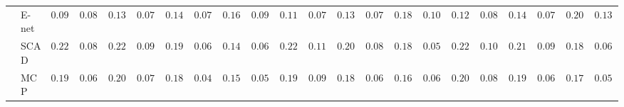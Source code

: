 \begin{tabular}{ll|ll|llllll|llllll|llllll}
 & E-net  & $0.0900$ & $0.0868$ & $0.1300$ & $0.0771$ & $0.1433$ & $0.0750$ & $0.1600$ & $0.0945$ & $0.1100$ & $0.0793$ & $0.1317$ & $0.0722$ & $0.1850$ & $0.1083$ & $0.1200$ & $0.0857$ & $0.1400$ & $0.0739$ & $0.2083$ & $0.1306$ \\
 & SCAD  & $0.2200$ & $0.0883$ & $0.2267$ & $0.0903$ & $0.1950$ & $0.0672$ & $0.1450$ & $0.0655$ & $0.2217$ & $0.1186$ & $0.2067$ & $0.0890$ & $0.1833$ & $0.0556$ & $0.2250$ & $0.1043$ & $0.2117$ & $0.0943$ & $0.1817$ & $0.0631$ \\
 & MCP  & $0.1967$ & $0.0686$ & $0.2017$ & $0.0796$ & $0.1817$ & $0.0479$ & $0.1550$ & $0.0592$ & $0.1983$ & $0.0908$ & $0.1850$ & $0.0622$ & $0.1617$ & $0.0602$ & $0.2067$ & $0.0858$ & $0.1950$ & $0.0672$ & $0.1733$ & $0.0576$ \\
\hline 
\end{tabular}

